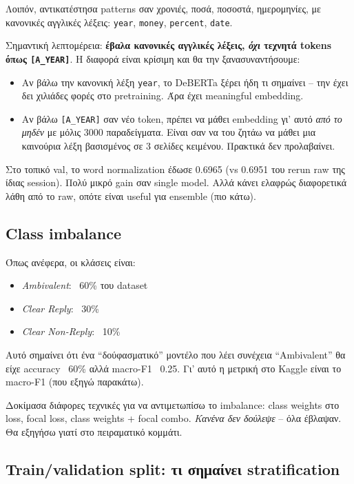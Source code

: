 \documentclass[12pt]{fphw}
\begin{document}
Λοιπόν, αντικατέστησα patterns σαν χρονιές, ποσά, ποσοστά, ημερομηνίες, με κανονικές αγγλικές λέξεις: \texttt{year}, \texttt{money}, \texttt{percent}, \texttt{date}.

Σημαντική λεπτομέρεια: \textbf{έβαλα κανονικές αγγλικές λέξεις, \emph{όχι} τεχνητά tokens όπως \texttt{[A\_YEAR]}}. Η διαφορά είναι κρίσιμη και θα την ξανασυναντήσουμε:

\begin{itemize}
    \item Αν βάλω την κανονική λέξη \texttt{year}, το DeBERTa ξέρει ήδη τι σημαίνει -- την έχει δει χιλιάδες φορές στο pretraining. Άρα έχει meaningful embedding.
    \item Αν βάλω \texttt{[A\_YEAR]} σαν νέο token, πρέπει να μάθει embedding γι' αυτό \emph{από το μηδέν} με μόλις 3000 παραδείγματα. Είναι σαν να του ζητάω να μάθει μια καινούρια λέξη βασισμένος σε 3 σελίδες κειμένου. Πρακτικά δεν προλαβαίνει.
\end{itemize}

Στο τοπικό val, το word normalization έδωσε 0.6965 (vs 0.6951 του rerun raw της ίδιας session). Πολύ μικρό gain σαν single model. Αλλά κάνει ελαφρώς διαφορετικά λάθη από το raw, οπότε είναι useful για ensemble (πιο κάτω).

\subsection{Class imbalance}

Όπως ανέφερα, οι κλάσεις είναι:

\begin{itemize}
    \item \emph{Ambivalent}: ~60\% του dataset
    \item \emph{Clear Reply}: ~30\%
    \item \emph{Clear Non-Reply}: ~10\%
\end{itemize}

Αυτό σημαίνει ότι ένα ``δούφασματικό'' μοντέλο που λέει συνέχεια ``Ambivalent'' θα είχε accuracy ~60\% αλλά macro-F1 ~0.25. Γι' αυτό η μετρική στο Kaggle είναι το macro-F1 (που εξηγώ παρακάτω).

Δοκίμασα διάφορες τεχνικές για να αντιμετωπίσω το imbalance: class weights στο loss, focal loss, class weights + focal combo. \emph{Κανένα δεν δούλεψε} -- όλα έβλαψαν. Θα εξηγήσω γιατί στο πειραματικό κομμάτι.

\subsection{Train/validation split: τι σημαίνει stratification}
\end{document}
